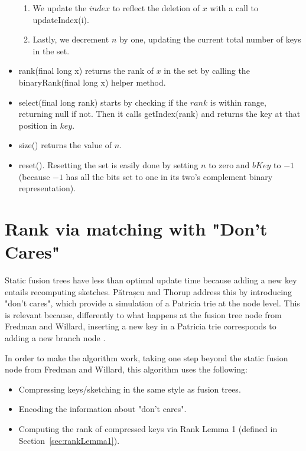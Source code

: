 \begin{itemize}
\begin{enumerate}
        \item
        We update the $index$ to reflect the deletion of $x$ with a call to {\ttfamily updateIndex(i)}.
        
        \item
        Lastly, we decrement $n$ by one, updating the current total number of keys in the set.
    \end{enumerate}
    
    \item
    {\ttfamily rank(final long x)} returns the rank of $x$ in the set by calling the {\ttfamily binaryRank(final long x)} helper method.
    
    \item
    {\ttfamily select(final long rank)} starts by checking if the $rank$ is within range, returning {\ttfamily null} if not. Then it calls {\ttfamily getIndex(rank)} and returns the key at that position in $key$.
    
    \item
    {\ttfamily size()} returns the value of $n$.
    
    \item
    {\ttfamily reset()}.
    Resetting the set is easily done by setting $n$ to zero and $bKey$ to $-1$ (because $-1$ has all the bits set to one in its two's complement binary representation).
\end{itemize}

\section{Rank via matching with "Don't Cares"}

Static fusion trees have less than optimal update time because adding a new key entails recomputing sketches. Pătrașcu and Thorup address this by introducing "don't cares", which provide a simulation of a Patricia trie at the node level. This is relevant because, differently to what happens at the fusion tree node from Fredman and Willard, inserting a new key in a Patricia trie corresponds to adding a new branch node \cite{patrascu2014dynamic}.

In order to make the algorithm work, taking one step beyond the static fusion node from Fredman and Willard, this algorithm uses the following:
\begin{itemize}
    \item
    Compressing keys/sketching in the same style as fusion trees.
    
    \item
    Encoding the information about "don't cares".
    
    \item
    Computing the rank of compressed keys via Rank Lemma 1 (defined in Section~\ref{sec:rankLemma1}).
\end{itemize}

